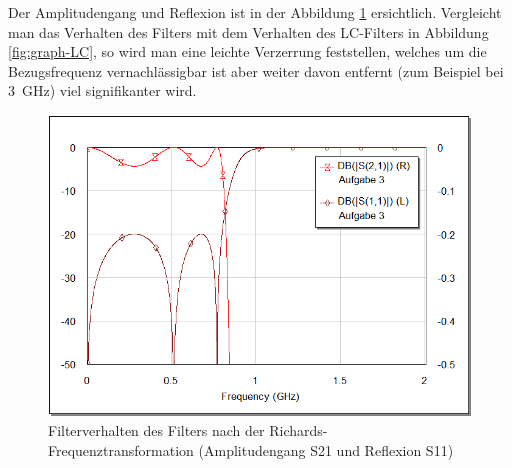 Der Amplitudengang und Reflexion ist in der Abbildung \ref{fig:graph-richards}
ersichtlich.  Vergleicht  man  das Verhalten des Filters mit dem Verhalten des
LC-Filters  in  Abbildung  \ref{fig:graph-LC},  so   wird   man  eine  leichte
Verzerrung  feststellen,  welches um die Bezugsfrequenz vernachl\"assigbar ist
aber  weiter  davon  entfernt  (zum  Beispiel  bei  \SI{3}{\giga\hertz})  viel
signifikanter wird.

\begin{figure}[h!]
    \centering
    \includegraphics[width=\imagewidth]{images/graph-richards}
    \caption{Filterverhalten des Filters nach der Richards-Frequenztransformation (Amplitudengang S21 und Reflexion S11)}
    \label{fig:graph-richards}
\end{figure}

